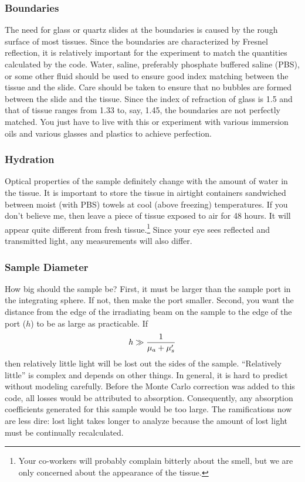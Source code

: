 \documentclass{article}
\begin{document}
\subsubsection{Boundaries}
The need for glass or quartz slides at the boundaries is caused by
the rough surface of most tissues.  Since the boundaries are characterized
by Fresnel reflection, it is relatively important for the experiment to
match the quantities calculated by the code.  Water, saline, preferably
phosphate buffered saline (PBS), or some
other fluid should be used to ensure good index matching between
the tissue and the slide.  Care should be taken to ensure that no bubbles 
are formed between
the slide and the tissue.  Since the index of refraction
of glass is 1.5 and that of tissue ranges from 1.33 to, say, 1.45, the
boundaries are not perfectly matched.  You just have to live with this
or experiment with various immersion oils and various glasses and plastics
to achieve perfection.

\subsubsection{Hydration} 
Optical properties of the sample definitely change with the amount of water in the
tissue.  It is important to store the tissue in airtight containers
sandwiched between moist (with PBS) towels at cool (above
freezing) temperatures.  If you don't believe me, then leave a piece of
tissue exposed to air for 48 hours.  It will appear quite different from
fresh tissue.\footnote{Your co-workers will probably complain
bitterly about the smell, but we are only concerned about the appearance of
the tissue.}  Since your eye sees reflected and transmitted light, any
measurements will also differ.

\subsubsection{Sample Diameter}
How big should the sample be?  First, it must be larger than the sample port
in the integrating sphere.  If not, then make the port smaller.  Second,
you want the distance from the edge of the irradiating beam on the sample
to the edge of the port ($h$) to be as large as practicable. If
\begin{eqnarray*}
h \gg {1\over \mu_a+\mu_s'}
\end{eqnarray*}
then relatively little light will be lost out the sides of the sample.  
``Relatively little'' is complex and depends on other things.  In general,
it is hard to predict without modeling carefully.  Before the Monte Carlo
correction was added to this code, all losses would be attributed to absorption.  Consequently, any absorption coefficients generated for this sample would be too large.  The ramifications now are less dire: lost light takes longer to analyze because
the amount of lost light must be continually recalculated.  
\end{document}
